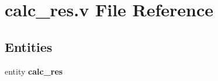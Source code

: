 \section{calc\-\_\-res.\-v File Reference}
\label{calc__res_8v}
\subsection*{Entities}
\begin{DoxyCompactItemize}
\item 
entity {\bf calc\-\_\-res}
\end{DoxyCompactItemize}
